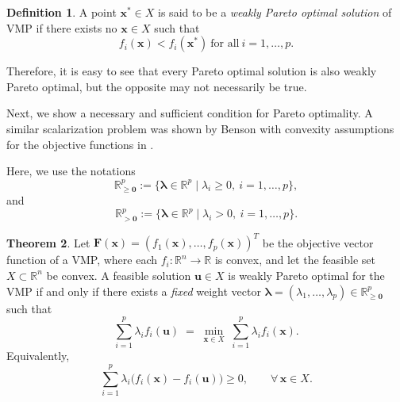 \documentclass{article}
\theoremstyle{definition}
\newtheorem{maar}{Definition}[section]
\newtheorem{theorem}[maar]{Theorem}
\begin{document}
\begin{maar}\label{wPar}
A point $\boldsymbol x^* \in X$ is said to be a \emph{weakly Pareto optimal solution} of VMP if there exists no $\boldsymbol x \in X$ such that
$$f_i(\boldsymbol x) < f_i(\boldsymbol x^*)\ \text{for all}\ i=1,\dots,p.$$
\end{maar}
Therefore, it is easy to see that every Pareto optimal solution is also weakly Pareto optimal, but the opposite may not necessarily be true.

Next, we show a necessary and sufficient condition for Pareto optimality. A similar scalarization problem was shown by Benson with convexity assumptions for the objective functions in \cite{Benson}.

Here, we use the notations
$$
\mathbb{R}^p_{\ge \boldsymbol 0} := \{ \boldsymbol{\lambda}\in\mathbb{R}^p \mid \lambda_i \ge 0,\ i=1,\dots,p \}, 
$$
and
$$
\mathbb{R}^p_{> \boldsymbol 0} := \{ \boldsymbol{\lambda}\in\mathbb{R}^p \mid \lambda_i > 0,\ i=1,\dots,p \}.
$$

\begin{theorem}\cite{Benson}
\label{sufnecpar_convex}
Let $\boldsymbol F(\boldsymbol x) = (f_1(\boldsymbol x),\dots,f_p(\boldsymbol x))^T$
be the objective vector function of a VMP, where each $f_i:\mathbb{R}^n\to\mathbb{R}$
is convex, and let the feasible set $X\subset\mathbb{R}^n$ be convex.
A feasible solution $\boldsymbol u\in X$ is weakly Pareto optimal for the VMP if and only if
there exists a \emph{fixed} weight vector
$\boldsymbol\lambda=(\lambda_1,\dots,\lambda_p)\in\mathbb{R}^p_{\ge \boldsymbol 0}$ such that
\[
\sum_{i=1}^p \lambda_i f_i(\boldsymbol u)
\;=\;
\min_{\boldsymbol x\in X}\;
\sum_{i=1}^p \lambda_i f_i(\boldsymbol x).
\]
Equivalently,
\[
\sum_{i=1}^p \lambda_i\bigl(f_i(\boldsymbol x)-f_i(\boldsymbol u)\bigr)\ge 0,
\qquad \forall\,\boldsymbol x\in X .
\]
\end{theorem}
\end{document}
